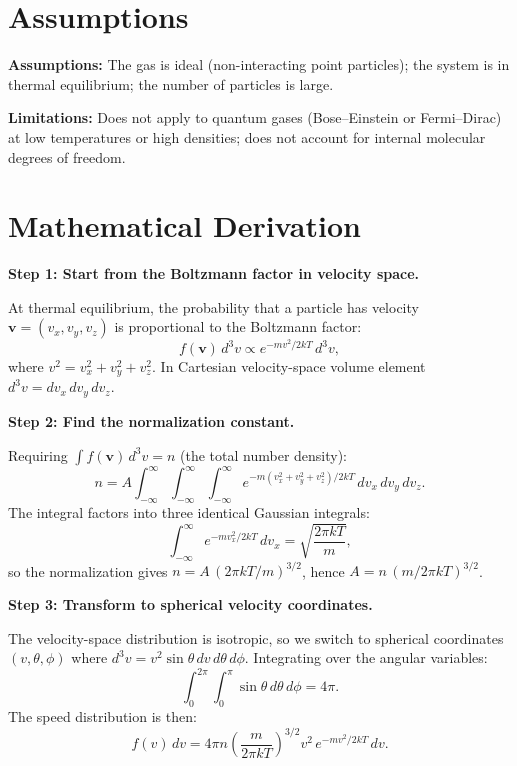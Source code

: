 \section*{Assumptions}

\textbf{Assumptions:} The gas is ideal (non-interacting point particles); the system is in thermal equilibrium; the number of particles is large.


\textbf{Limitations:} Does not apply to quantum gases (Bose--Einstein or Fermi--Dirac) at low temperatures or high densities; does not account for internal molecular degrees of freedom.


\section*{Mathematical Derivation}

\textbf{Step 1: Start from the Boltzmann factor in velocity space.}

At thermal equilibrium, the probability that a particle has velocity $\mathbf{v} = (v_x, v_y, v_z)$ is proportional to the Boltzmann factor:
\begin{equation}
f(\mathbf{v})\,d^{3}v \propto e^{-mv^{2}/2kT}\,d^{3}v,
\end{equation}
where $v^{2} = v_x^{2} + v_y^{2} + v_z^{2}$. In Cartesian velocity-space volume element $d^{3}v = dv_x\,dv_y\,dv_z$.

\textbf{Step 2: Find the normalization constant.}

Requiring $\int f(\mathbf{v})\,d^{3}v = n$ (the total number density):
\begin{equation}
n = A\int_{-\infty}^{\infty}\!\!\int_{-\infty}^{\infty}\!\!\int_{-\infty}^{\infty} e^{-m(v_x^{2}+v_y^{2}+v_z^{2})/2kT}\,dv_x\,dv_y\,dv_z.
\end{equation}
The integral factors into three identical Gaussian integrals:
\begin{equation}
\int_{-\infty}^{\infty} e^{-mv_x^{2}/2kT}\,dv_x = \sqrt{\frac{2\pi kT}{m}},
\end{equation}
so the normalization gives $n = A\,(2\pi kT/m)^{3/2}$, hence $A = n\,(m/2\pi kT)^{3/2}$.

\textbf{Step 3: Transform to spherical velocity coordinates.}

The velocity-space distribution is isotropic, so we switch to spherical coordinates $(v, \theta, \phi)$ where $d^{3}v = v^{2}\sin\theta\,dv\,d\theta\,d\phi$. Integrating over the angular variables:
\begin{equation}
\int_{0}^{2\pi}\!\!\int_{0}^{\pi} \sin\theta\,d\theta\,d\phi = 4\pi.
\end{equation}
The speed distribution is then:
\begin{equation}
f(v)\,dv = 4\pi n\left(\frac{m}{2\pi kT}\right)^{3/2} v^{2}\,e^{-mv^{2}/2kT}\,dv.
\end{equation}

